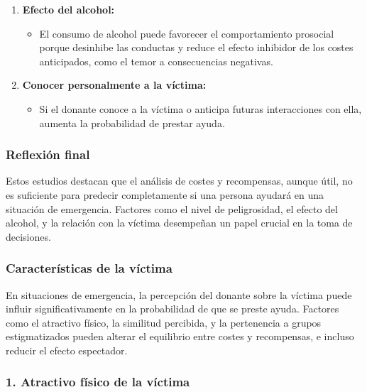 \documentclass[
]{book}
\providecommand{\tightlist}{%
  \setlength{\itemsep}{0pt}\setlength{\parskip}{0pt}}
\begin{document}
\begin{enumerate}
\def\labelenumi{\arabic{enumi}.}
\tightlist
\item
  \textbf{Efecto del alcohol:}

  \begin{itemize}
  \tightlist
  \item
    El consumo de alcohol puede favorecer el comportamiento prosocial porque desinhibe las conductas y reduce el efecto inhibidor de los costes anticipados, como el temor a consecuencias negativas.
  \end{itemize}
\item
  \textbf{Conocer personalmente a la víctima:}

  \begin{itemize}
  \tightlist
  \item
    Si el donante conoce a la víctima o anticipa futuras interacciones con ella, aumenta la probabilidad de prestar ayuda.
  \end{itemize}
\end{enumerate}

\subsubsection{Reflexión final}\label{reflexiuxf3n-final}

Estos estudios destacan que el análisis de costes y recompensas, aunque útil, no es suficiente para predecir completamente si una persona ayudará en una situación de emergencia. Factores como el nivel de peligrosidad, el efecto del alcohol, y la relación con la víctima desempeñan un papel crucial en la toma de decisiones.

\subsubsection{Características de la víctima}\label{caracteruxedsticas-de-la-vuxedctima-1}

En situaciones de emergencia, la percepción del donante sobre la víctima puede influir significativamente en la probabilidad de que se preste ayuda. Factores como el atractivo físico, la similitud percibida, y la pertenencia a grupos estigmatizados pueden alterar el equilibrio entre costes y recompensas, e incluso reducir el efecto espectador.

\subsubsection{\texorpdfstring{1. \textbf{Atractivo físico de la víctima}}{1. Atractivo físico de la víctima}}\label{atractivo-fuxedsico-de-la-vuxedctima}
\end{document}
